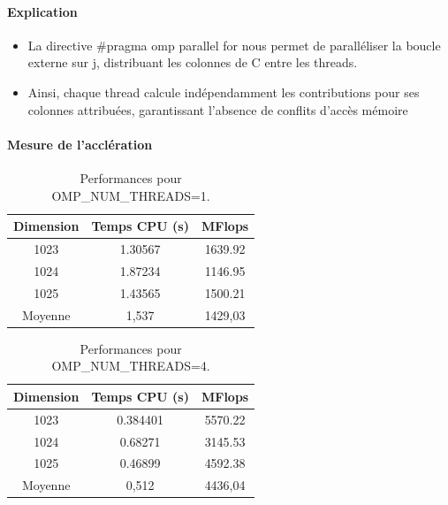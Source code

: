 \documentclass[a4paper,13pt]{book}
\begin{document}
\paragraph{Explication}
\begin{itemize}
    \item La directive \#pragma omp parallel for nous permet de paralléliser la boucle externe sur j, distribuant les colonnes de C entre les threads.
    \item Ainsi, chaque thread calcule indépendamment les contributions pour ses colonnes attribuées, garantissant l'absence de conflits d'accès mémoire
\end{itemize}
\paragraph{Mesure de l'acclération}

\begin{table}[h!]
    \begin{center}
    \begin{tabular}{|c|c|c|}
        \hline
        Dimension & Temps CPU (s) & MFlops \\ \hline
        1023      & 1.30567       & 1639.92 \\ \hline
        1024      & 1.87234       & 1146.95 \\ \hline
        1025      & 1.43565        & 1500.21 \\ \hline
        Moyenne      & 1,537        & 1429,03 \\ \hline

    \end{tabular}
    \caption{Performances pour OMP\_NUM\_THREADS=1.}
\end{center}
\end{table}

\begin{table}[h!]
    \begin{center}
    \begin{tabular}{|c|c|c|}
        \hline
        Dimension & Temps CPU (s) & MFlops \\ \hline
        1023      & 0.384401       & 5570.22 \\ \hline
        1024      & 0.68271       & 3145.53 \\ \hline
        1025      & 0.46899        & 4592.38 \\ \hline
        Moyenne      & 0,512        & 4436,04 \\ \hline
    \end{tabular}
    \caption{Performances pour OMP\_NUM\_THREADS=4.}
\end{center}
\end{table}
\end{document}
